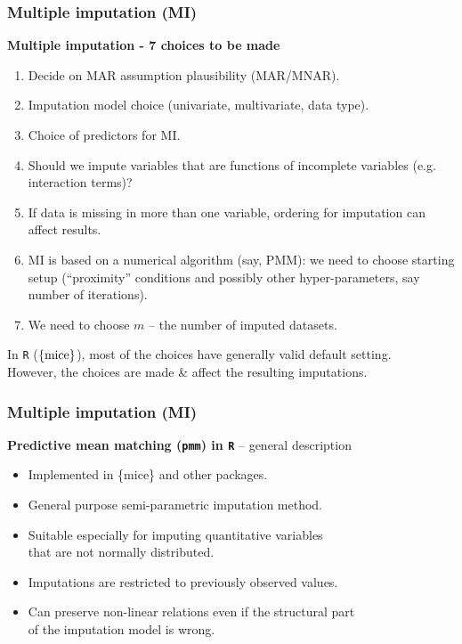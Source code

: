 \documentclass{beamer}
\begin{document}
\begin{frame}
\frametitle{Multiple imputation (MI)}
\textbf{Multiple imputation - 7 choices to be made}\\
\smallskip
\begin{enumerate}
    \item Decide on MAR assumption plausibility (MAR/MNAR).
    \item Imputation model choice (univariate, multivariate, data type).
    \item Choice of predictors for MI.
    \item Should we impute variables that are functions of incomplete variables (e.g. interaction terms)?
    \item If data is missing in more than one variable, ordering for imputation can affect results.
    \item MI is based on a numerical algorithm (say, PMM): we need to choose starting setup (``proximity'' conditions and possibly other hyper-parameters, say number of iterations).
    \item We need to choose $m$ -- the number of imputed datasets.
\end{enumerate}
\smallskip
In \texttt{R} ($\{ \textnormal{mice} \}$), most of the choices have generally valid default setting.\\
\smallskip
However, the choices are made \& affect the resulting imputations.
\end{frame}
\begin{frame}
\frametitle{Multiple imputation (MI)}
\textbf{Predictive mean matching (\texttt{pmm}) in \texttt{R}} -- general description\\
\bigskip
\begin{itemize}
    \item Implemented in \{mice\} and other packages.
    \medskip
    \item General purpose semi-parametric imputation method.
    \medskip
    \item Suitable especially for imputing quantitative variables \\that are not normally distributed.
    \medskip
    \item Imputations are restricted to previously observed values.
    \medskip
    \item Can preserve non-linear relations even if the structural part \\of the imputation model is wrong.
\end{itemize}
\end{frame}
\end{document}
